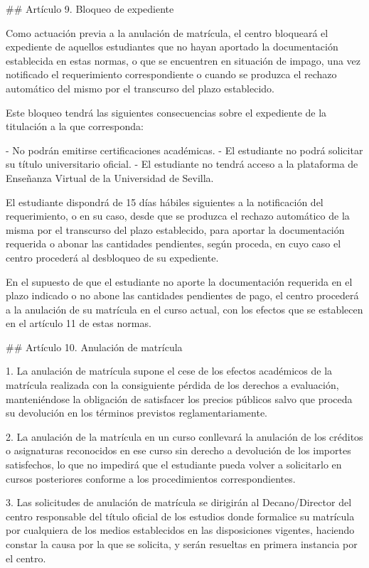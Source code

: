 \documentclass{article}
\begin{document}
\begin{itemize}
\begin{itemize}
\begin{scriptsize}
                  \#\# Artículo 9. Bloqueo de expediente

                  Como actuación previa a la anulación de matrícula, el centro bloqueará el expediente de aquellos estudiantes que no hayan aportado la documentación establecida en estas normas, o que se encuentren en situación de impago, una vez notificado el requerimiento correspondiente o cuando se produzca el rechazo automático del mismo por el transcurso del plazo establecido.

                  Este bloqueo tendrá las siguientes consecuencias sobre el expediente de la titulación a la que corresponda:

                  - No podrán emitirse certificaciones académicas.
                  - El estudiante no podrá solicitar su título universitario oficial.
                  - El estudiante no tendrá acceso a la plataforma de Enseñanza Virtual de la Universidad de Sevilla.

                  El estudiante dispondrá de 15 días hábiles siguientes a la notificación del requerimiento, o en su caso, desde que se produzca el rechazo automático de la misma por el transcurso del plazo establecido, para aportar la documentación requerida o abonar las cantidades pendientes, según proceda, en cuyo caso el centro procederá al desbloqueo de su expediente.

                  En el supuesto de que el estudiante no aporte la documentación requerida en el plazo indicado o no abone las cantidades pendientes de pago, el centro procederá a la anulación de su matrícula en el curso actual, con los efectos que se establecen en el artículo 11 de estas normas.

                  \#\# Artículo 10. Anulación de matrícula

                  1. La anulación de matrícula supone el cese de los efectos académicos de la matrícula realizada con la consiguiente pérdida de los derechos a evaluación, manteniéndose la obligación de satisfacer los precios públicos salvo que proceda su devolución en los términos previstos reglamentariamente.

                  2. La anulación de la matrícula en un curso conllevará la anulación de los créditos o asignaturas reconocidos en ese curso sin derecho a devolución de los importes satisfechos, lo que no impedirá que el estudiante pueda volver a solicitarlo en cursos posteriores conforme a los procedimientos correspondientes.

                  3. Las solicitudes de anulación de matrícula se dirigirán al Decano/Director del centro responsable del título oficial de los estudios donde formalice su matrícula por cualquiera de los medios establecidos en las disposiciones vigentes, haciendo constar la causa por la que se solicita, y serán resueltas en primera instancia por el centro.


\end{scriptsize}
\end{itemize}
\end{itemize}
\end{document}
